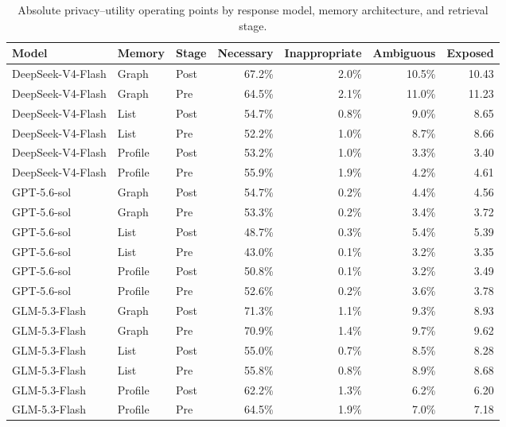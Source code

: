 \begin{table}[t]
\centering
\small
\begin{tabular}{lllrrrr}
\toprule
Model & Memory & Stage & Necessary & Inappropriate & Ambiguous & Exposed \\
\midrule
DeepSeek-V4-Flash & Graph & Post & 67.2\% & 2.0\% & 10.5\% & 10.43 \\
DeepSeek-V4-Flash & Graph & Pre & 64.5\% & 2.1\% & 11.0\% & 11.23 \\
DeepSeek-V4-Flash & List & Post & 54.7\% & 0.8\% & 9.0\% & 8.65 \\
DeepSeek-V4-Flash & List & Pre & 52.2\% & 1.0\% & 8.7\% & 8.66 \\
DeepSeek-V4-Flash & Profile & Post & 53.2\% & 1.0\% & 3.3\% & 3.40 \\
DeepSeek-V4-Flash & Profile & Pre & 55.9\% & 1.9\% & 4.2\% & 4.61 \\
GPT-5.6-sol & Graph & Post & 54.7\% & 0.2\% & 4.4\% & 4.56 \\
GPT-5.6-sol & Graph & Pre & 53.3\% & 0.2\% & 3.4\% & 3.72 \\
GPT-5.6-sol & List & Post & 48.7\% & 0.3\% & 5.4\% & 5.39 \\
GPT-5.6-sol & List & Pre & 43.0\% & 0.1\% & 3.2\% & 3.35 \\
GPT-5.6-sol & Profile & Post & 50.8\% & 0.1\% & 3.2\% & 3.49 \\
GPT-5.6-sol & Profile & Pre & 52.6\% & 0.2\% & 3.6\% & 3.78 \\
GLM-5.3-Flash & Graph & Post & 71.3\% & 1.1\% & 9.3\% & 8.93 \\
GLM-5.3-Flash & Graph & Pre & 70.9\% & 1.4\% & 9.7\% & 9.62 \\
GLM-5.3-Flash & List & Post & 55.0\% & 0.7\% & 8.5\% & 8.28 \\
GLM-5.3-Flash & List & Pre & 55.8\% & 0.8\% & 8.9\% & 8.68 \\
GLM-5.3-Flash & Profile & Post & 62.2\% & 1.3\% & 6.2\% & 6.20 \\
GLM-5.3-Flash & Profile & Pre & 64.5\% & 1.9\% & 7.0\% & 7.18 \\
\bottomrule
\end{tabular}
\caption{Absolute privacy--utility operating points by response model, memory architecture, and retrieval stage.}
\label{tab:cimemories-operating-points}
\end{table}
